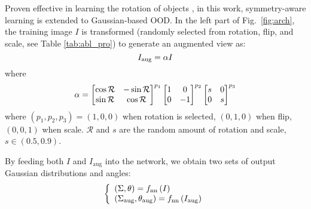 Proven effective in learning the rotation of objects \cite{yu2023h2rboxv2}, in this work, symmetry-aware learning is extended to Gaussian-based OOD. In the left part of Fig.~\ref{fig:arch}, the training image $I$ is transformed (randomly selected from rotation, flip, and scale, see Table \ref{tab:abl_pro}) to generate an augmented view as:
\begin{equation} \setlength\abovedisplayskip{6pt} \setlength\belowdisplayskip{6pt}
I_\text{aug} = \alpha I
\end{equation}
where
\begin{equation} \setlength\abovedisplayskip{6pt} \setlength\belowdisplayskip{6pt}
\alpha = \begin{bmatrix}
 \cos \mathcal{R} & -\sin \mathcal{R} \\
 \sin \mathcal{R} & \cos \mathcal{R}
\end{bmatrix}^{p_1}
\begin{bmatrix}
 1 & 0 \\
 0 & -1
\end{bmatrix}^{p_2}
\begin{bmatrix}
 s & 0 \\
 0 & s
\end{bmatrix}^{p_3}
\end{equation}
where $(p_1, p_2, p_3) = (1, 0, 0)$ when rotation is selected, $(0, 1, 0)$ when flip, $(0, 0, 1)$ when scale. $\mathcal{R}$ and $s$ are the random amount of rotation and scale, $s \in (0.5, 0.9)$.

By feeding both $I$ and $I_\text{aug}$ into the network, we obtain two sets of output Gaussian distributions and angles:
\begin{equation} \setlength\abovedisplayskip{6pt} \setlength\belowdisplayskip{6pt}
\left\{\begin{array}l
\left ( \Sigma, \theta
\right ) = f_\text{nn}\left ( I \right ) \\
\left ( \Sigma_\text{aug}, \theta_\text{aug}
\right ) = f_\text{nn}\left ( I_\text{aug} \right )
\end{array}\right.
\end{equation}

